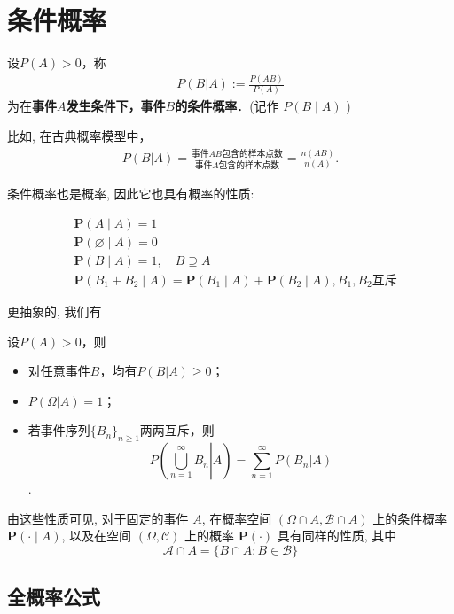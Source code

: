 \section{条件概率}

\begin{definition}
    设$P(A)>0$，称
    \begin{align*}
        P(B|A):=\frac{P(AB)}{P(A)}
    \end{align*}
    为在\textbf{事件$A$发生条件下，事件$B$的条件概率}．(记作 $P(B \mid A)$ )
\end{definition}

比如, 在古典概率模型中，
\begin{align*}
    P(B|A)=\frac{\mbox{事件$AB$包含的样本点数}}{\mbox{事件$A$包含的样本点数}}=\frac{n(AB)}{n(A)}.
\end{align*}

条件概率也是概率, 因此它也具有概率的性质:

$$
\begin{aligned}
& \mathbf{P}(A \mid A)=1 \\
& \mathbf{P}(\varnothing \mid A)=0 \\
& \mathbf{P}(B \mid A)=1, \quad B \supseteq A \\
& \mathbf{P}\left(B_1+B_2 \mid A\right)=\mathbf{P}\left(B_1 \mid A\right)+\mathbf{P}\left(B_2 \mid A\right), B_1,B_2\text{互斥}
\end{aligned}
$$

更抽象的, 我们有

\begin{proposition}
    设$P(A)>0$，则
    \begin{itemize}
        \item 对任意事件$B$，均有$P(B|A)\ge 0$；
        \item $P(\Omega|A)=1$；
        \item 若事件序列$\{B_n\}_{n\ge 1}$两两互斥，则
              $$P\left( \left. \bigcup_{n=1}^{\infty} B_n \right| A\right)=\sum_{n=1}^{\infty} P(B_n|A)$$
              .
    \end{itemize}
\end{proposition}

由这些性质可见, 对于固定的事件 $A$, 在概率空间 $(\Omega \cap A, \mathscr{B} \cap A)$ 上的条件概率 $\mathbf{P}(\cdot \mid A)$, 以及在空间 $(\Omega, \mathscr{C})$ 上的概率 $\mathbf{P}(\cdot)$ 具有同样的性质, 其中
$$
\mathscr{A} \cap A=\{B \cap A: B \in \mathscr{B}\}
$$

\subsection*{全概率公式}


